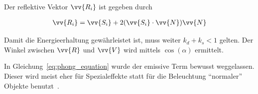 Der reflektive Vektor $\vv{R_{i}}$ ist gegeben durch

\begin{gather}
    \vv{R_{i}} = \vv{S_{i}} + 2(\vv{S_{i}} \cdot \vv{N})\vv{N}
\end{gather}

Damit die Energieerhaltung gewährleistet ist, muss weiter $k_{d} + k_{s}
< 1$ gelten. Der Winkel zwischen $\vv{R}$ und $\vv{V}$ wird mittels
$\cos(\alpha)$ ermittelt.

In Gleichung~\ref{eq:phong_equation} wurde der emissive Term bewusst
weggelassen.  Dieser wird meist eher für Spezialeffekte statt für die
Beleuchtung ``normaler'' Objekte benutzt~\parencite{hughes_computer_2013}.
